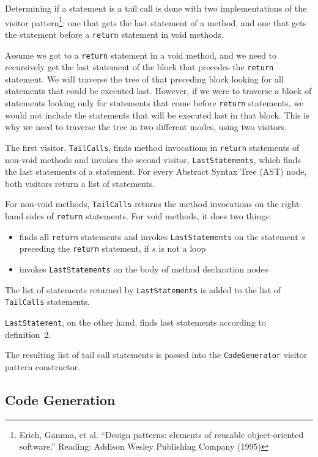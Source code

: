 \documentclass{tufte-handout}
\begin{document}
Determining if a statement is a tail call is done with two implementations of the visitor pattern\footnote{Erich, Gamma, et al. ``Design patterns: elements of reusable object-oriented software.'' Reading: Addison Wesley Publishing Company (1995)}:  one that gets the last statement of a method, and one that gets the statement before a \verb'return' statement in void methods.

Assume we got to a \verb'return' statement in a void method, and we need to recursively get the last statement of the block that precedes the \verb'return' statement. We will traverse the tree of that preceding block looking for all statements that could be executed last. However, if we were to traverse a block of statements looking only for statements that come before \verb'return' statements, we would not include the statements that will be executed last in that block. This is why we need to traverse the tree in two different modes, using two visitors.

The first visitor, \verb'TailCalls', finds method invocations in \verb'return' statements of non-void methods and invokes the second visitor, \verb'LastStatements', which finds the last statements of a statement. For every Abstract Syntax Tree (AST) node, both visitors return a list of statements.

For non-void methods, \verb'TailCalls' returns the method invocations on the right-hand sides of \verb'return' statements. For void methods, it does two things:
\begin{itemize}
  \item finds all \verb'return' statements and invokes \verb'LastStatements' on the statement $s$ preceding the \verb'return' statement, if $s$ is not a loop
  \item invokes \verb'LastStatements' on the body of method declaration nodes
\end{itemize}
The list of statements returned by \verb'LastStatements' is added to the list of \verb'TailCalls' statements. 

\verb'LastStatement', on the other hand, finds last statements according to definition~2.

The resulting list of tail call statements is passed into the \verb'CodeGenerator' visitor pattern constructor.

\subsection{Code Generation}
\end{document}
